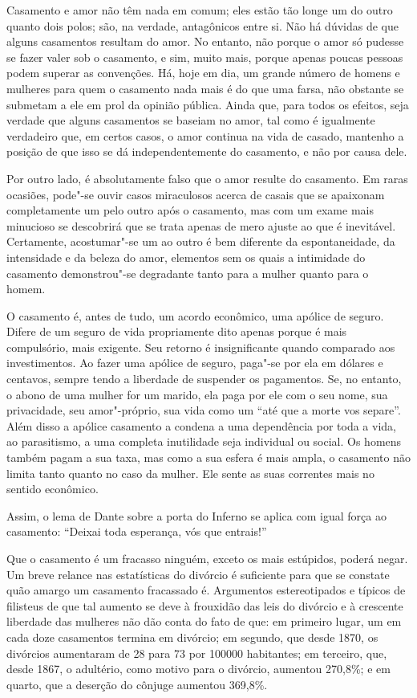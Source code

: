 Casamento e amor não têm nada em comum; eles estão tão longe um do outro
quanto dois polos; são, na verdade, antagônicos entre si. Não há dúvidas
de que alguns casamentos resultam do amor. No entanto, não porque o
amor só pudesse se fazer valer sob o casamento, e sim, muito mais,
porque apenas poucas pessoas podem superar as convenções. Há, hoje em
dia, um grande número de homens e mulheres para quem o casamento nada
mais é do que uma farsa, não obstante se submetam a ele em prol da
opinião pública. Ainda que, para todos os efeitos, seja verdade que
alguns casamentos se baseiam no amor, tal como é igualmente verdadeiro
que, em certos casos, o amor continua na vida de casado, mantenho
a posição de que isso se dá independentemente do casamento, e
não por causa dele.

Por outro lado, é absolutamente falso que o amor resulte do casamento.
Em raras ocasiões, pode"-se ouvir casos miraculosos acerca de casais que
se apaixonam completamente um pelo outro após o casamento, mas com um
exame mais minucioso se descobrirá que se trata apenas de mero ajuste ao
que é inevitável. Certamente, acostumar"-se um ao outro é bem diferente
da espontaneidade, da intensidade e da beleza do amor, elementos sem os
quais a intimidade do casamento demonstrou"-se degradante tanto para a
mulher quanto para o homem.

O casamento é, antes de tudo, um acordo econômico, uma apólice de
seguro. Difere de um seguro de vida propriamente dito apenas porque é
mais compulsório, mais exigente. Seu retorno é insignificante quando
comparado aos investimentos. Ao fazer uma apólice de seguro, paga"-se por
ela em dólares e centavos, sempre tendo a liberdade de suspender os
pagamentos. Se, no entanto, o abono de uma mulher for um marido, ela
paga por ele com o seu nome, sua privacidade, seu amor"-próprio, sua vida
como um ``até que a morte vos separe''. Além disso a apólice
casamento a condena a uma dependência por toda a vida, ao parasitismo, a
uma completa inutilidade seja individual ou social. Os homens também
pagam a sua taxa, mas como a sua esfera é mais ampla, o casamento não
limita tanto quanto no caso da mulher. Ele sente as suas correntes mais
no sentido econômico.

Assim, o lema de Dante sobre a porta do Inferno se aplica com igual força
ao casamento: ``Deixai toda esperança, vós que entrais!''

Que o casamento é um fracasso ninguém, exceto os mais
estúpidos, poderá negar. Um breve relance nas estatísticas do divórcio é
suficiente para que se constate quão amargo um casamento fracassado é. Argumentos
estereotipados e típicos de filisteus de que tal aumento se deve à frouxidão
das leis do divórcio e à crescente liberdade das mulheres não dão conta
do fato de que: em primeiro lugar, um em cada doze casamentos termina em
divórcio; em segundo, que desde 1870, os divórcios aumentaram de 28 para
73 por 100000 habitantes; em terceiro, que, desde 1867, o adultério,
como motivo para o divórcio, aumentou 270,8\%; e em quarto, que a
deserção do cônjuge aumentou 369,8\%.

